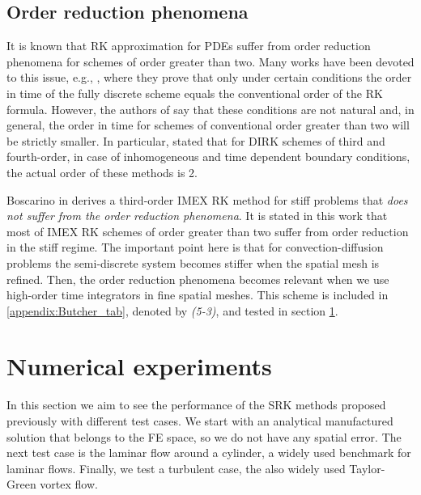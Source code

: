 \subsection{Order reduction phenomena}
\label{subsec-C6_order_reduction}
It is known that RK approximation for PDEs suffer from order reduction phenomena for schemes of order greater than two. Many works have been devoted to this issue, e.g., \cite{sanz-serna_convergence_1986,verwer_j._g._convergence_1986}, where they prove that only under certain conditions the order in time of the fully discrete scheme equals the conventional order of the RK formula. However, the authors of \cite{sanz-serna_convergence_1986,verwer_j._g._convergence_1986} say that these conditions are not natural and, in general, the order in time for schemes of conventional order greater than two will be strictly smaller. In particular, \cite{verwer_j._g._convergence_1986} stated that for DIRK schemes of third and fourth-order, in case of inhomogeneous and time dependent boundary conditions, the actual order of these methods is 2.

Boscarino in \cite{boscarino_accurate_2009} derives a third-order IMEX RK method for stiff problems that \emph{does not suffer from the order reduction phenomena}. It is stated in this work that most of IMEX RK schemes of order greater than two suffer from order reduction in the stiff regime. The important point here is that for convection-diffusion problems the semi-discrete system becomes stiffer when the spatial mesh is refined. Then, the order reduction phenomena becomes relevant when we use high-order time integrators in fine spatial meshes. This scheme is included in \ref{appendix:Butcher_tab}, denoted by \textit{(5-3)}, and tested in section \ref{sec-C6_experiments}.



\section{Numerical experiments}
\label{sec-C6_experiments}
In this section we aim to see the performance of the SRK methods proposed previously with different test cases. We start with an analytical manufactured solution that belongs to the FE space, so we do not have any spatial error. The next test case is the laminar flow around a cylinder, a widely used benchmark for laminar flows. Finally, we test a turbulent case, the also widely used Taylor-Green vortex flow.

